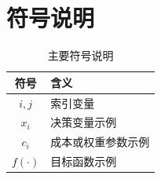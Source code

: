 \section{符号说明}
\label{sec:symbols}

\begin{table}[!htbp]
  \centering
  \caption{主要符号说明}
  \label{tab:symbols}
  \begin{tabular}{cl}
    \toprule
    符号 & 含义 \\
    \midrule
    $i,j$ & 索引变量 \\
    $x_i$ & 决策变量示例 \\
    $c_i$ & 成本或权重参数示例 \\
    $f(\cdot)$ & 目标函数示例 \\
    \bottomrule
  \end{tabular}
\end{table}
